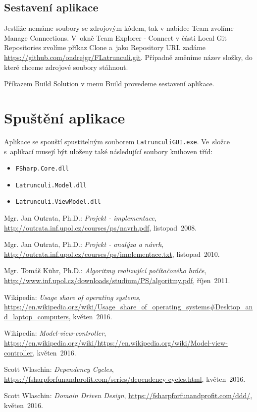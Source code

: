 \documentclass[12pt]{article}
\begin{document}
\subsection{Sestavení aplikace}
Jestliže nemáme soubory se zdrojovým kódem, tak v nabídce Team zvolíme Manage Connections. V~okně Team Explorer - Connect v části Local Git Repositories zvolíme příkaz Clone a~jako Repository URL zadáme \url{https://github.com/ondrejgr/FLatrunculi.git}. Případně změníme název složky, do které chceme zdrojové soubory stáhnout.

Příkazem Build Solution v menu Build provedeme sestavení aplikace.

\section{Spuštění aplikace}
Aplikace se spouští spustitelným souborem \texttt{LatrunculiGUI.exe}. Ve~složce s~aplikací musejí být uloženy také následující soubory knihoven tříd:
	\begin{itemize}  
		\item \texttt{FSharp.Core.dll}
		\item \texttt{Latrunculi.Model.dll}
		\item \texttt{Latrunculi.ViewModel.dll}
	\end{itemize}

\newpage
\begin{thebibliography}{10}
	
 Mgr. Jan Outrata, Ph.D.: \emph{Projekt - implementace},
 \url{http://outrata.inf.upol.cz/courses/ps/navrh.pdf},
			listopad~2008.

	
 Mgr. Jan Outrata, Ph.D.: \emph{Projekt - analýza a návrh},
 \url{http://outrata.inf.upol.cz/courses/ps/implementace.txt},
			listopad~2010.

 Mgr. Tomáš Kühr, Ph.D.: \emph{Algoritmy realizující počítačového hráče},
 \url{http://www.inf.upol.cz/downloads/studium/PS/algoritmy.pdf},
			říjen~2011.

Wikipedia: \emph{Usage share of operating systems},
 \url{https://en.wikipedia.org/wiki/Usage_share_of_operating_systems#Desktop_and_laptop_computers},
			květen~2016.

Wikipedia: \emph{Model-view-controller},
 \url{https://en.wikipedia.org/wiki/https://en.wikipedia.org/wiki/Model-view-controller},
			květen~2016.


Scott Wlaschin: \emph{Dependency Cycles},
 \url{https://fsharpforfunandprofit.com/series/dependency-cycles.html},
			květen~2016.

Scott Wlaschin: \emph{Domain Driven Design},
 \url{https://fsharpforfunandprofit.com/ddd/},
			květen~2016.

\end{thebibliography} 
\end{document}
